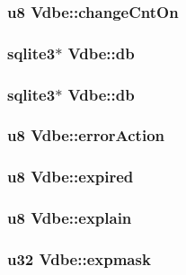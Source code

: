 \subsubsection{\setlength{\rightskip}{0pt plus 5cm}\bf{u8} \bf{Vdbe::change\-Cnt\-On}}\label{structVdbe_2ae22443da3762a5136e8870c87201d8}


\subsubsection{\setlength{\rightskip}{0pt plus 5cm}\bf{sqlite3}$\ast$ \bf{Vdbe::db}}\label{structVdbe_fecf120b55d072a8357ee007eb36bcab}


\subsubsection{\setlength{\rightskip}{0pt plus 5cm}\bf{sqlite3}$\ast$ \bf{Vdbe::db}}\label{structVdbe_fecf120b55d072a8357ee007eb36bcab}


\subsubsection{\setlength{\rightskip}{0pt plus 5cm}\bf{u8} \bf{Vdbe::error\-Action}}\label{structVdbe_6a36048f8e2070a1449cb26aad44caf6}


\subsubsection{\setlength{\rightskip}{0pt plus 5cm}\bf{u8} \bf{Vdbe::expired}}\label{structVdbe_68eb10d66787f042d1f8ccec26e96d2c}


\subsubsection{\setlength{\rightskip}{0pt plus 5cm}\bf{u8} \bf{Vdbe::explain}}\label{structVdbe_50bfa3f626dadf83d761d65c81524fdd}


\subsubsection{\setlength{\rightskip}{0pt plus 5cm}\bf{u32} \bf{Vdbe::expmask}}\label{structVdbe_7bd96ae9f93b12293b1e03328d02c931}


